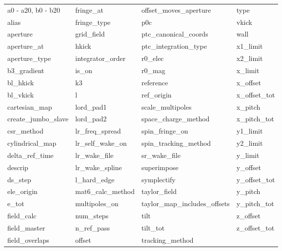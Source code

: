  \begin{tabular}{llll} \toprule
a0 - a20, b0 - b20          & fringe_at                   & offset_moves_aperture       & type                        \\
alias                       & fringe_type                 & p0c                         & vkick                       \\
aperture                    & grid_field                  & ptc_canonical_coords        & wall                        \\
aperture_at                 & hkick                       & ptc_integration_type        & x1_limit                    \\
aperture_type               & integrator_order            & r0_elec                     & x2_limit                    \\
b3_gradient                 & is_on                       & r0_mag                      & x_limit                     \\
bl_hkick                    & k3                          & reference                   & x_offset                    \\
bl_vkick                    & l                           & ref_origin                  & x_offset_tot                \\
cartesian_map               & lord_pad1                   & scale_multipoles            & x_pitch                     \\
create_jumbo_slave          & lord_pad2                   & space_charge_method         & x_pitch_tot                 \\
csr_method                  & lr_freq_spread              & spin_fringe_on              & y1_limit                    \\
cylindrical_map             & lr_self_wake_on             & spin_tracking_method        & y2_limit                    \\
delta_ref_time              & lr_wake_file                & sr_wake_file                & y_limit                     \\
descrip                     & lr_wake_spline              & superimpose                 & y_offset                    \\
ds_step                     & l_hard_edge                 & symplectify                 & y_offset_tot                \\
ele_origin                  & mat6_calc_method            & taylor_field                & y_pitch                     \\
e_tot                       & multipoles_on               & taylor_map_includes_offsets & y_pitch_tot                 \\
field_calc                  & num_steps                   & tilt                        & z_offset                    \\
field_master                & n_ref_pass                  & tilt_tot                    & z_offset_tot                \\
field_overlaps              & offset                      & tracking_method             &                             \\
 \bottomrule
 \end{tabular}
